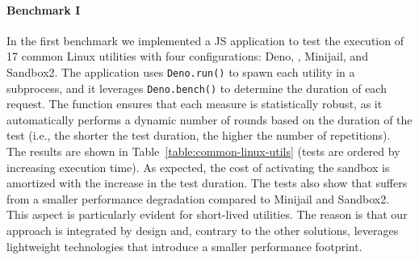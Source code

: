 \paragraph{Benchmark I}
%
In the first benchmark we implemented a JS application to test the
execution of 17 common Linux utilities with
four configurations: Deno, \natisand, Minijail, and Sandbox2. The
application uses {\tt Deno.run()} to spawn each utility in a
subprocess, and it leverages {\tt Deno.bench()} to determine the duration of each request. The
function ensures that each measure is statistically robust, as it
automatically performs a dynamic number of rounds based on the
duration of the test (i.e., the shorter the test duration, the higher
the number of repetitions). The results are shown in
Table~\ref{table:common-linux-utils} (tests are ordered by increasing
execution time). As expected, the cost of activating the sandbox is
amortized with the increase in the test duration. The tests also show
that \natisand suffers from a smaller performance degradation compared to
Minijail and Sandbox2. This aspect is particularly evident for
short-lived utilities. The reason is that our approach is integrated
by design and, contrary to the other solutions, leverages lightweight
technologies that introduce a smaller performance footprint.

